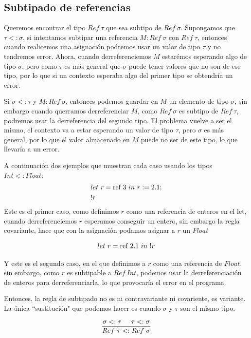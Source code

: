 \subsection{Subtipado de referencias}
Queremos encontrar el tipo $Ref~\tau$ que sea subtipo de $Ref~\sigma$. Supongamos que $\tau <: \sigma$, si intentamos subtipar una referencia $M:Ref~\sigma$ con $Ref~\tau$, entonces cuando realicemos una asignación podremos usar un valor de tipo $\tau$ y no tendremos error. Ahora, cuando derreferenciemos $M$ estarémos esperando algo de tipo $\sigma$, pero como $\tau$ es más general que $\sigma$ puede tener valores que no son de ese tipo, por lo que si un contexto esperaba algo del primer tipo se obtendría un error.

Si  $\sigma <: \tau$ y $M: Ref~\sigma$, entonces podemos guardar en $M$ un elemento de tipo $\sigma$, sin embargo cuando querramos derreferenciar $M$, como $Ref~\sigma$ es subtipo de $Ref~\tau$, podremos usar la derreferencia del segundo tipo. El problema vuelve a ser el mismo, el contexto va a estar esperando un valor de tipo $\tau$, pero $\sigma$ es más general, por lo que el valor almacenado en $M$ puede no ser de este tipo, lo que llevaría a un error.

A continuación dos ejemplos que muestran cada caso usando los tipos $Int <: Float$:
\begin{align*}
&let~r = \text{ref}~3~in~r := 2.1; \\
&!r
\end{align*}
Este es el primer caso, como definimos $r$ como una referencia de enteros en el let, cuando derreferenciemos $r$ esperamos conseguir un entero, sin embargo la regla covariante, hace que con la asignación podamos asignar a $r$ un $Float$

\begin{align}
let~r = \text{ref}~2.1~in~!r
\end{align}

Y este es el segundo caso, en el que definimos a $r$ como una referencia de $Float$, sin embargo, como $r$ es subtipable a $Ref~Int$, podemos usar la derreferenciación de enteros para derreferenciarla, lo que provocaría el error en el programa.

Entonces, la regla de subtipado no es ni contravariante ni covariente, es variante. La única ``sustitución" que podemos hacer es cuando $\sigma$ y $\tau$ son el mismo tipo.

$$\frac{\sigma <: \tau\hspace*{5mm} \tau <: \sigma}{Ref~\tau <: Ref~\sigma}$$

